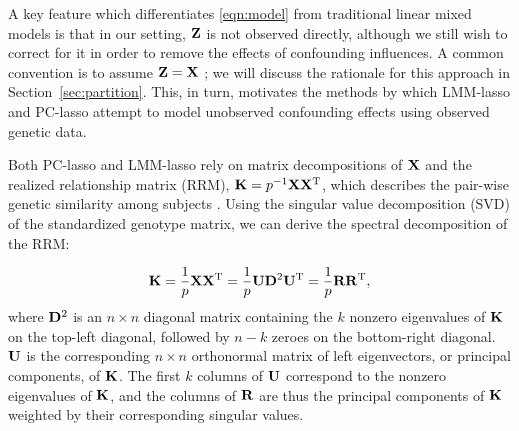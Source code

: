 A key feature which differentiates \eqref{eqn:model} from traditional linear mixed models is that in our setting, $\mathbf{Z}$ is not observed directly, although we still wish to correct for it in order to remove the effects of confounding influences. A common convention is to assume $\mathbf{Z} = \mathbf{X}$ \citep{wang2018multiplex, lippert2011fast, yang2014advantages}; we will discuss the rationale for this approach in Section~\ref{sec:partition}.  This, in turn, motivates the methods by which LMM-lasso and PC-lasso attempt to model unobserved confounding effects using observed genetic data.

Both PC-lasso and LMM-lasso rely on matrix decompositions of $\mathbf{X}$ and the realized relationship matrix (RRM), $\mathbf{K} = p^{-1} \mathbf{X} \mathbf{X}^{\text{T}}$, which describes the pair-wise genetic similarity among subjects \citep{patterson2006population, hayes2009increased}. Using the singular value decomposition (SVD) of the standardized genotype matrix, we can derive the spectral decomposition of the RRM: 

\begin{equation}
    \label{eqn:k}
    \mathbf{K} = \frac{1}{p} \mathbf{X} \mathbf{X}^{\text{T}} = \frac{1}{p} \mathbf{U} \mathbf{D}^2 \mathbf{U}^{\text{T}} = \frac{1}{p} \mathbf{R} \mathbf{R}^{\text{T}},
\end{equation}
where $\mathbf{D}^2$ is an $n \times n$ diagonal matrix containing the $k$ nonzero eigenvalues of $\mathbf{K}$ on the top-left diagonal, followed by $n - k$ zeroes on the bottom-right diagonal. $\mathbf{U}$ is the corresponding $n \times n$ orthonormal matrix of left eigenvectors, or principal components, of $\mathbf{K}$. The first $k$ columns of $\mathbf{U}$ correspond to the nonzero eigenvalues of $\mathbf{K}$, and the columns of $\mathbf{R}$ are thus the principal components of $\mathbf{K}$ weighted by their corresponding singular values. 

